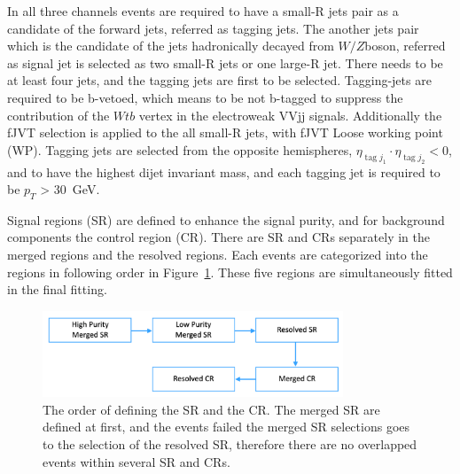 In all three channels events are required to have a small-R jets pair as a candidate of the forward jets, referred as tagging jets. The another jets pair which is the candidate of the jets hadronically decayed from $W/Z$boson, referred as signal jet is selected as two small-R jets or one large-R jet.
There needs to be at least four jets, and the tagging jets are first to be selected. Tagging-jets are required to be b-vetoed, which means to be not b-tagged to suppress the contribution of the $Wtb$ vertex in the electroweak VVjj signals. Additionally the fJVT selection is applied to the all small-R jets, with fJVT Loose working point (WP). Tagging jets are selected from the opposite hemispheres, $\eta_{\operatorname{tag} j_{1}} \cdot \eta_{\operatorname{tag} j_{2}}<0$, and to have the highest dijet invariant mass, and each tagging jet is required to be $p_T$ > 30~GeV.

Signal regions (SR) are defined to enhance the signal purity, and for background  components the control region (CR). There are SR and CRs separately in the merged regions and the resolved regions.
Each events are categorized into the regions in following order in Figure~\ref{fig:order}. These five regions are simultaneously fitted in the final fitting.

\begin{figure}[ht]
    \centering
    \includegraphics[width=0.8\textwidth]{figures/order}
    \caption{The order of defining the SR and the CR. The merged SR are defined at first, and the events failed the merged SR selections goes to the selection of the resolved SR, therefore there are no overlapped events within several SR and CRs.}
    \label{fig:order}
\end{figure}

